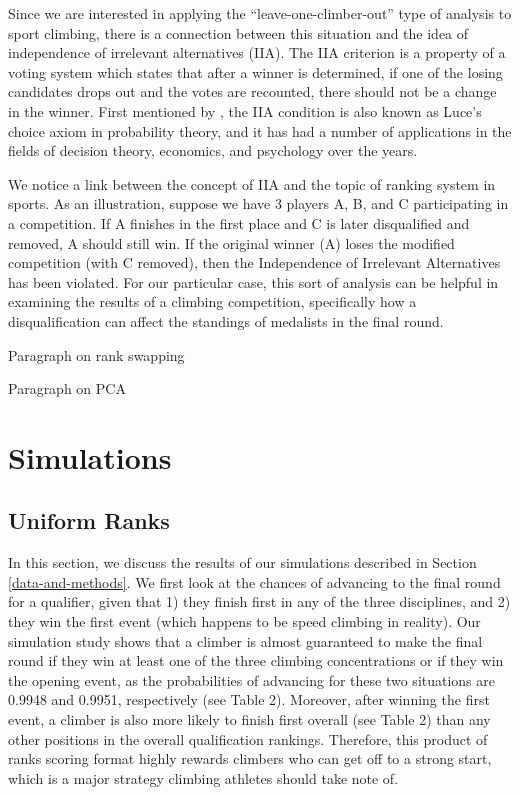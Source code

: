 \documentclass[12pt]{article}
\begin{document}
Since we are interested in applying the ``leave-one-climber-out'' type
of analysis to sport climbing, there is a connection between this
situation and the idea of independence of irrelevant alternatives (IIA).
The IIA criterion is a property of a voting system which states that
after a winner is determined, if one of the losing candidates drops out
and the votes are recounted, there should not be a change in the winner.
First mentioned by \citet{arrow1951}, the IIA condition is also known as
Luce's choice axiom \citep{luce1959} in probability theory, and it has
had a number of applications in the fields of decision theory,
economics, and psychology over the years.

We notice a link between the concept of IIA and the topic of ranking
system in sports. As an illustration, suppose we have 3 players A, B,
and C participating in a competition. If A finishes in the first place
and C is later disqualified and removed, A should still win. If the
original winner (A) loses the modified competition (with C removed),
then the Independence of Irrelevant Alternatives has been violated. For
our particular case, this sort of analysis can be helpful in examining
the results of a climbing competition, specifically how a
disqualification can affect the standings of medalists in the final
round.

Paragraph on rank swapping

Paragraph on PCA

\hypertarget{simulations}{%
\section{Simulations}\label{simulations}}

\hypertarget{uniform-ranks}{%
\subsection{Uniform Ranks}\label{uniform-ranks}}

In this section, we discuss the results of our simulations described in
Section \ref{data-and-methods}. We first look at the chances of
advancing to the final round for a qualifier, given that 1) they finish
first in any of the three disciplines, and 2) they win the first event
(which happens to be speed climbing in reality). Our simulation study
shows that a climber is almost guaranteed to make the final round if
they win at least one of the three climbing concentrations or if they
win the opening event, as the probabilities of advancing for these two
situations are 0.9948 and 0.9951, respectively (see Table 2). Moreover,
after winning the first event, a climber is also more likely to finish
first overall (see Table 2) than any other positions in the overall
qualification rankings. Therefore, this product of ranks scoring format
highly rewards climbers who can get off to a strong start, which is a
major strategy climbing athletes should take note of.
\end{document}
